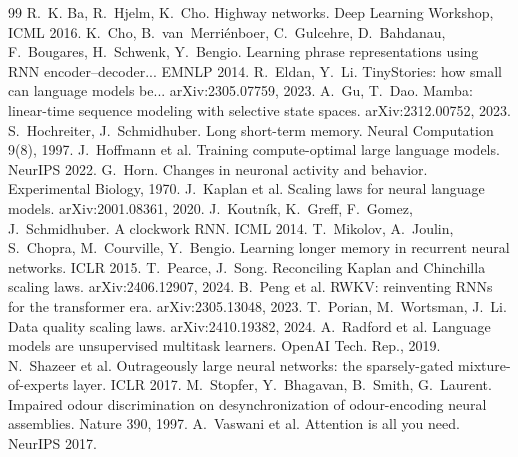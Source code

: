 \documentclass[11pt]{article}
\begin{document}

\begin{thebibliography}{99}
 R.~K. Ba, R.~Hjelm, K.~Cho.
Highway networks. Deep Learning Workshop, ICML 2016.
 K.~Cho, B.~van~Merri\'enboer,
C.~Gulcehre, D.~Bahdanau, F.~Bougares, H.~Schwenk, Y.~Bengio. Learning
phrase representations using RNN encoder--decoder... EMNLP 2014.
 R.~Eldan, Y.~Li.
TinyStories: how small can language models be... arXiv:2305.07759, 2023.
 A.~Gu, T.~Dao. Mamba:
linear-time sequence modeling with selective state spaces. arXiv:2312.00752,
2023.
 S.~Hochreiter,
J.~Schmidhuber. Long short-term memory. Neural Computation 9(8), 1997.
 J.~Hoffmann et al.
Training compute-optimal large language models. NeurIPS 2022.
 G.~Horn. Changes in neuronal
activity and behavior. Experimental Biology, 1970.
 J.~Kaplan et al. Scaling
laws for neural language models. arXiv:2001.08361, 2020.
 J.~Koutn\'ik,
K.~Greff, F.~Gomez, J.~Schmidhuber. A clockwork RNN. ICML 2014.
 T.~Mikolov,
A.~Joulin, S.~Chopra, M.~Courville, Y.~Bengio. Learning longer memory in
recurrent neural networks. ICLR 2015.
 T.~Pearce, J.~Song.
Reconciling Kaplan and Chinchilla scaling laws. arXiv:2406.12907, 2024.
 B.~Peng et al. RWKV: reinventing
RNNs for the transformer era. arXiv:2305.13048, 2023.
 T.~Porian, M.~Wortsman,
J.~Li. Data quality scaling laws. arXiv:2410.19382, 2024.
 A.~Radford et al.
Language models are unsupervised multitask learners. OpenAI Tech. Rep., 2019.
 N.~Shazeer et al.
Outrageously large neural networks: the sparsely-gated mixture-of-experts
layer. ICLR 2017.
 M.~Stopfer, Y.~Bhagavan,
B.~Smith, G.~Laurent. Impaired odour discrimination on desynchronization of
odour-encoding neural assemblies. Nature 390, 1997.
 A.~Vaswani et al.
Attention is all you need. NeurIPS 2017.
\end{thebibliography}
\end{document}
